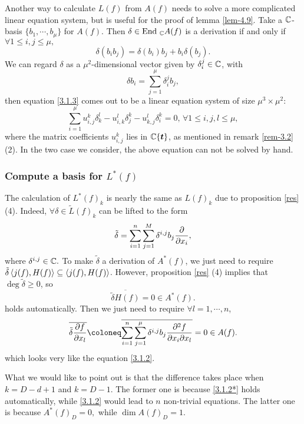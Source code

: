   \begin{remark}\label{rem-3.3}
    Another way to calculate $L(f)$ from $A(f)$ needs to solve a more complicated linear equation system, but is useful for the proof of lemma \ref{lem-4.9}. Take a  ${\mathbb{C}}$-basis  $\{b_1,\cdots, b_\mu\}$ for $A(f)$. Then $\delta \in \operatorname{End}\,_{\mathbb{C}} A(f)$ is a derivation if and only if $\forall 1\leqslant i ,j \leqslant \mu,$
    \begin{equation}\label{3.1.3}
      \delta(b_ib_j)=\delta (b_i)b_j+b_i\delta(b_j).
    \end{equation}
    We can regard $\delta$ as a $\mu^2$-dimensional vector given by $\delta_i^j\in {\mathbb{C}}$, with
    \[\delta b_i = \sum_{j=1}^\mu \delta_i^j b_j,\]
    then equation \eqref{3.1.3} comes out to be a linear equation system of size $\mu^3\times \mu^2$:
    \[\sum_{i=1}^\mu u_{i,j}^k\delta_k^l-u_{i,k}^l\delta_j^k-u_{k,j}^l\delta_i^k=0,\, \forall 1\leqslant i,j,l\leqslant \mu,\]
    where the matrix coefficients $u_{i,j}^k$ lies in ${\mathbb{C}}\{{\boldsymbol t}\}$, as mentioned in remark \ref{rem-3.2} (2). In the two case we consider, the above equation can not be solved by hand.
  \end{remark}

  \subsubsection{Compute a basis for \texorpdfstring{$L^*(f)$}{L*(f)}}\label{sec-3.1.3}
  The calculation of $L^*(f)_k$ is nearly the same as $L(f)_k$ due to proposition \ref{res} (4).
  Indeed, $\forall \delta \in \tilde L(f)_k$  can be lifted to the form
  \[\tilde \delta = \sum_{i=1}^n \sum_{j=1}^M \delta^{i,j} b_j \frac{\partial }{\partial x_i}, \]
  where $\delta^{i,j} \in {\mathbb{C}}.$  	To make $\tilde \delta $ a derivation of $A^*(f)$, we just need to require $\tilde \delta \left\langle j(f), H(f) \right\rangle \subseteq \left\langle j(f), H(f) \right\rangle$. However, proposition \ref{res} (4) implies that $\deg \tilde \delta \geqslant 0$, so 
  \[
    \overline{\tilde \delta H(f)} = 0 \in A^*(f).
  \]
  holds automatically. Then we just need to require $\forall l = 1,\cdots, n$, 
  \begin{equation}\label{3.1.2*}
    \overline{\tilde \delta \pd f {x_l} } \coloneq  
    \overline{ \sum_{i=1}^n \sum_{j=1}^\mu \delta^{i,j} b_ j\frac{\partial^2 f }{\partial x_i \partial x_l }} = 0 \in A(f).
  \end{equation}
  which looks very like the equation \eqref{3.1.2}.


  What we would like to point out  is that the difference takes place when $k=D-d+1$ and $k=D-1$. The former one is because \eqref{3.1.2*} holds automatically, while \eqref{3.1.2} would lead to $n$ non-trivial equations. The latter one is because $A^*(f)_D=0,$ while $\dim A(f)_D=1$.

